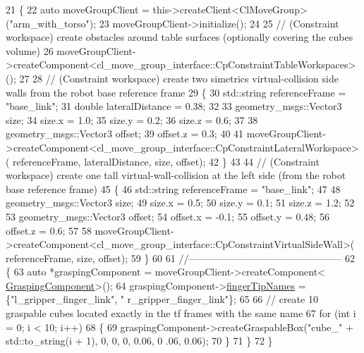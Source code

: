 \begin{DoxyCode}
21         \{
22             \textcolor{keyword}{auto} moveGroupClient = this->createClient<ClMoveGroup>(\textcolor{stringliteral}{"arm\_with\_torso"});
23             moveGroupClient->initialize();
24 
25             \textcolor{comment}{// (Constraint workspace) create obstacles around table surfaces (optionally covering the cubes
       volume)}
26             moveGroupClient->createComponent<cl\_move\_group\_interface::CpConstraintTableWorkspaces>();
27 
28             \textcolor{comment}{// (Constraint workspace) create two simetrics virtual-collision side walls from the robot base
       reference frame}
29             \{
30                 std::string referenceFrame = \textcolor{stringliteral}{"base\_link"};
31                 \textcolor{keywordtype}{double} lateralDistance = 0.38;
32 
33                 geometry\_msgs::Vector3 size;
34                 size.x = 1.0;
35                 size.y = 0.2;
36                 size.z = 0.6;
37 
38                 geometry\_msgs::Vector3 offset;
39                 offset.z = 0.3;
40 
41                 moveGroupClient->createComponent<cl\_move\_group\_interface::CpConstraintLateralWorkspace>(
      referenceFrame, lateralDistance, size, offset);
42             \}
43 
44             \textcolor{comment}{// (Constraint workspace) create one tall virtual-wall-collision at the left side (from the
       robot base reference frame)}
45             \{
46                 std::string referenceFrame = \textcolor{stringliteral}{"base\_link"};
47 
48                 geometry\_msgs::Vector3 size;
49                 size.x = 0.5;
50                 size.y = 0.1;
51                 size.z = 1.2;
52 
53                 geometry\_msgs::Vector3 offset;
54                 offset.x = -0.1;
55                 offset.y = 0.48;
56                 offset.z = 0.6;
57 
58                 moveGroupClient->createComponent<cl\_move\_group\_interface::CpConstraintVirtualSideWall>(
      referenceFrame, size, offset);
59             \}
60 
61             \textcolor{comment}{//-----------------------------------------------}
62             \{
63                 \textcolor{keyword}{auto} *graspingComponent = moveGroupClient->createComponent<
      \hyperlink{classcl__move__group__interface_1_1GraspingComponent}{GraspingComponent}>();
64                 graspingComponent->\hyperlink{classcl__move__group__interface_1_1GraspingComponent_afc08a0abc3220a377d0bbf798383a42a}{fingerTipNames} = \{\textcolor{stringliteral}{"l\_gripper\_finger\_link"}, \textcolor{stringliteral}{"
      r\_gripper\_finger\_link"}\};
65 
66                 \textcolor{comment}{// create 10 graspable cubes located exactly in the tf frames with the same name }
67                 \textcolor{keywordflow}{for} (\textcolor{keywordtype}{int} i = 0; i < 10; i++)
68                 \{
69                     graspingComponent->createGraspableBox(\textcolor{stringliteral}{"cube\_"} + std::to\_string(i + 1), 0, 0, 0, 0.06, 0
      .06, 0.06);
70                 \}
71             \}
72         \}
\end{DoxyCode}



